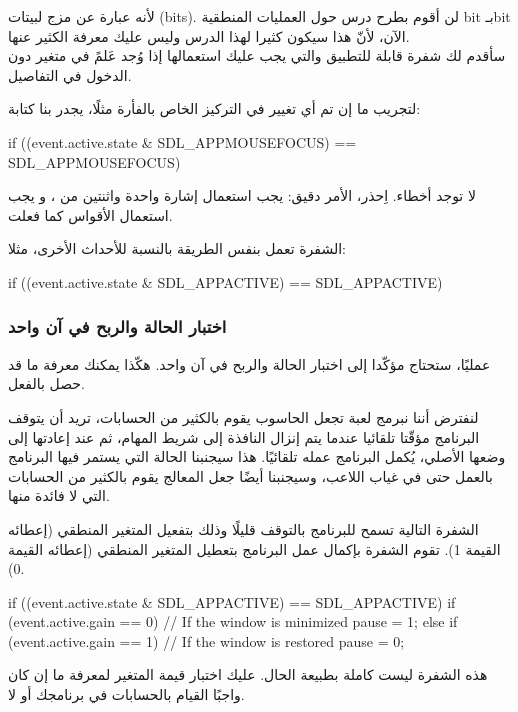لأنه عبارة عن مزج لبيتات 
(\textenglish{bits}).
لن أقوم بطرح درس حول العمليات المنطقية 
\textenglish{bit}
بـ\textenglish{bit}
الآن، لأنّ هذا سيكون كثيرا لهذا الدرس وليس عليك معرفة الكثير عنها.\\
سأقدم لك شفرة قابلة للتطبيق والتي يجب عليك استعمالها إذا وُجد عَلمً في متغير دون الدخول في التفاصيل. 

لتجريب ما إن تم أي تغيير في التركيز الخاص بالفأرة مثلًا، يجدر بنا كتابة:  

\begin{Csource}
if ((event.active.state & SDL_APPMOUSEFOCUS) == SDL_APPMOUSEFOCUS)
\end{Csource}

لا توجد أخطاء. اِحذر، الأمر دقيق: يجب استعمال إشارة
\InlineCode{\&}
واحدة واثنتين من
\InlineCode{=}،
و يجب استعمال الأقواس كما فعلت.

الشفرة تعمل بنفس الطريقة بالنسبة للأحداث الأخرى، مثلا:  

\begin{Csource}
if ((event.active.state & SDL_APPACTIVE) == SDL_APPACTIVE)
\end{Csource}

\subsubsection{اختبار الحالة والربح في آن واحد}

عمليًا، ستحتاج مؤكّدا إلى  اختبار الحالة والربح في آن واحد. هكّذا يمكنك معرفة ما قد حصل بالفعل.

لنفترض أننا نبرمج لعبة تجعل الحاسوب يقوم بالكثير من الحسابات، تريد أن يتوقف البرنامج مؤقّتا تلقائيا عندما يتم إنزال النافذة إلى شريط المهام، ثم عند إعادتها إلى وضعها الأصلي، يُكمل البرنامج عمله تلقائيًا. هذا سيجنبنا الحالة التي يستمر فيها البرنامج بالعمل حتى في غياب اللاعب، وسيجنبنا أيضًا جعل المعالج يقوم بالكثير من الحسابات التي لا فائدة منها.

الشفرة التالية تسمح للبرنامج بالتوقف قليلًا وذلك بتفعيل المتغير المنطقي 
(إعطائه القيمة 1). تقوم الشفرة بإكمال عمل البرنامج بتعطيل المتغير المنطقي (إعطائه القيمة 0).

\begin{Csource}
if ((event.active.state & SDL_APPACTIVE) == SDL_APPACTIVE)
{
	if (event.active.gain == 0) // If the window is minimized
		pause = 1;
	else if (event.active.gain == 1) // If the window is restored
		pause = 0;
}
\end{Csource}

\begin{information}
هذه الشفرة ليست كاملة بطبيعة الحال. عليك اختبار قيمة المتغير
لمعرفة ما إن كان واجبًا القيام بالحسابات في برنامجك أو لا.
\end{information}

